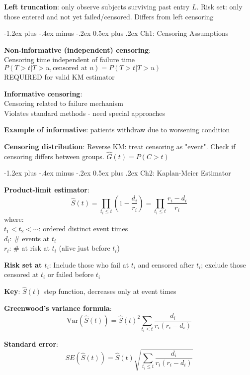 ﻿\documentclass[10pt,letterpaper]{extarticle}
\makeatletter
\renewcommand{\section}{\@startsection{section}{1}{0mm}%
                                {-1.2ex plus -.4ex minus -.2ex}%
                                {0.5ex plus .2ex}%
                                {\normalfont\normalsize\bfseries}}
\newcommand{\h}[1]{\textbf{#1}}
\makeatother
\begin{document}
\begin{multicols}{3}
\h{Left truncation}: only observe subjects surviving past entry $L$. Risk set: only those entered and not yet failed/censored. Differs from left censoring

\section{Ch1: Censoring Assumptions}

\h{Non-informative (independent) censoring}: \\
Censoring time independent of failure time \\
$P(T>t | T>u, \text{censored at } u) = P(T>t | T>u)$ \\
REQUIRED for valid KM estimator

\h{Informative censoring}: \\
Censoring related to failure mechanism \\
Violates standard methods - need special approaches

\h{Example of informative}: patients withdraw due to worsening condition

\h{Censoring distribution}: Reverse KM: treat censoring as "event". Check if censoring differs between groups. $\hat{G}(t) = P(C > t)$

\vspace{2pt}
\section{Ch2: Kaplan-Meier Estimator}

\h{Product-limit estimator}: \\
$$\hat{S}(t) = \prod_{t_i \le t} \left(1 - \frac{d_i}{r_i}\right) = \prod_{t_i \le t} \frac{r_i - d_i}{r_i}$$
where: \\
$t_1 < t_2 < \cdots$: ordered distinct event times \\
$d_i$: \# events at $t_i$ \\
$r_i$: \# at risk at $t_i$ (alive just before $t_i$)

\h{Risk set at $t_i$}: Include those who fail at $t_i$ and censored after $t_i$; exclude those censored at $t_i$ or failed before $t_i$

\h{Key}: $\hat{S}(t)$ step function, decreases only at event times

\h{Greenwood's variance formula}: \\
$$\text{Var}(\hat{S}(t)) = \hat{S}(t)^2 \sum_{t_i \le t} \frac{d_i}{r_i(r_i - d_i)}$$

\h{Standard error}: \\
$$SE(\hat{S}(t)) = \hat{S}(t) \sqrt{\sum_{t_i \le t} \frac{d_i}{r_i(r_i-d_i)}}$$


\end{multicols}
\end{document}
